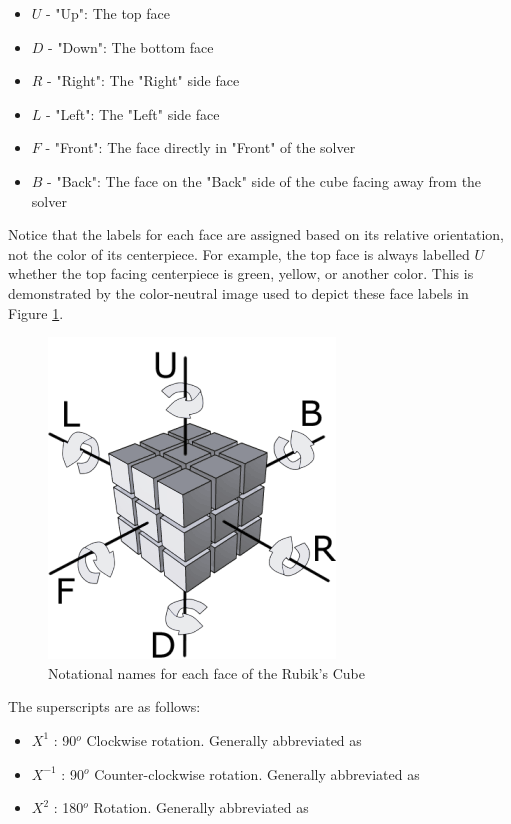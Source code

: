 \begin{itemize}
    \item $U$ - "Up": The top face
    \item $D$ - "Down": The bottom face
    \item $R$ - "Right": The "Right" side face
    \item $L$ - "Left": The "Left" side face
    \item $F$ - "Front": The face directly in "Front" of the solver
    \item $B$ - "Back": The face on the "Back" side of the cube facing away from the solver
\end{itemize}

Notice that the labels for each face are assigned based on its relative
orientation, not the color of its centerpiece. For example, the top
face is always labelled $U$ whether the top facing centerpiece is
green, yellow, or another color. This is demonstrated by the
color-neutral image used to depict these face labels in Figure
\ref{fig:cube-notation}.

\begin{figure}[h]
    \centering
    \caption[Rubik's Cube Notation]{Notational names for each face of the Rubik's Cube \cite{img-cube-notation}}
    \label{fig:cube-notation}
    \includegraphics{Figures/2 Background/rubik's_cube_notation_bw.png}
\end{figure}

\newpage
The superscripts are as follows:

\begin{itemize}
    \item $X^1$ : 90$^o$ Clockwise rotation. Generally abbreviated as 
    \item $X^{-1}$ : 90$^o$ Counter-clockwise rotation. Generally abbreviated as 
    \item $X^2$ : 180$^o$ Rotation. Generally abbreviated as 
\end{itemize}


